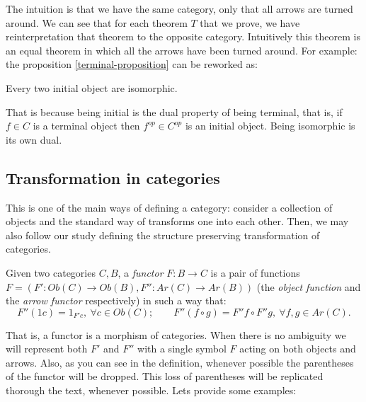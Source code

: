 The intuition is that we have the same category, only that all arrows are turned around. We can see that  for each theorem $T$ that we prove, we have reinterpretation that theorem to the opposite category. Intuitively this theorem is an equal theorem in which all the arrows have been turned around. For example: the proposition
\ref{terminal-proposition} can be reworked as:

\begin{proposition}
  Every two initial object are isomorphic.
\end{proposition}


That is because being initial is the dual property of being terminal, that is, if $f\in C$ is a terminal object then $f^{op}\in C^{op}$ is an initial object. Being isomorphic is its own dual.
\subsection{Transformation in categories}




This is one of the main ways of defining a category: consider a collection of objects and the standard way of transforms one into each other. Then, we may also follow our study defining the structure preserving transformation of categories.

\begin{definition}
  Given two categories $C, B$, a \emph{functor} $F: B \to C$ is a pair of functions $F=(F':Ob(C)\to Ob(B),F'':Ar(C)\to Ar(B))$ (the \emph{object function} and the \emph{arrow functor} respectively) in such a way that:
  $$F''(1c) = 1_{F'c}, \ \forall c \in Ob(C); \qquad F''(f\circ g) = F''f \circ F''g, \ \forall f,g  \in Ar(C).$$

\end{definition}


That is,  a functor is a morphism of categories. When there is no ambiguity we will represent both $F'$ and $F''$ with a single symbol $F$ acting on both objects and arrows. Also, as you can see in the definition, whenever possible the parentheses of the functor will be dropped. This loss of parentheses will be replicated thorough the text, whenever possible. Lets provide some examples:\\

